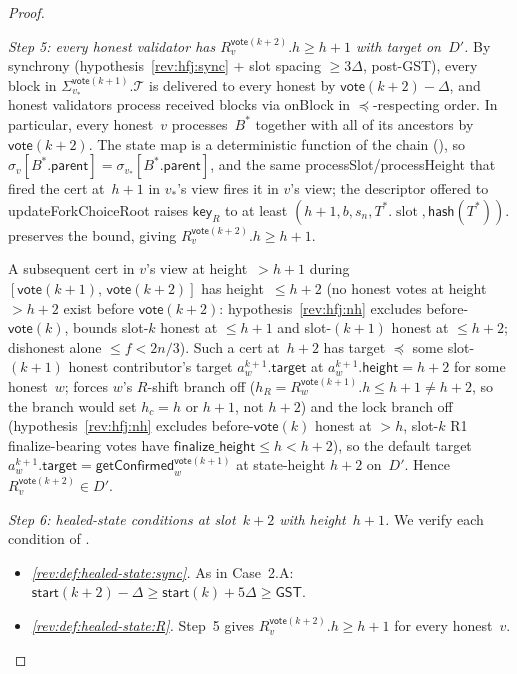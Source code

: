 \documentclass{article}
\newcommand{\T}[0]{\ensuremath{\mathcal{T}}}
\newcommand{\slot}[0]{\ensuremath{\operatorname{\mathrm{slot}}}}
\newcommand{\target}{\mathsf{target}}
\newcommand{\height}{\mathsf{height}}
\newcommand{\parent}{\mathsf{parent}}
\newcommand{\finalizeHeight}{\mathsf{finalize\_height}}
\newcommand{\hash}{\mathsf{hash}}
\newcommand{\key}{\mathsf{key}}
\newcommand{\start}{\mathsf{start}}
\newcommand{\vote}{\mathsf{vote}}
\newcommand{\updateForkChoiceRoot}{\textsf{updateForkChoiceRoot}\xspace}
\newcommand{\getConfirmed}{\textsf{getConfirmed}\xspace}
\theoremstyle{plain}
\theoremstyle{definition}
\theoremstyle{remark}
\newcommand{\GST}{\ensuremath{\mathsf{GST}}}
\begin{document}
\begin{proof}
\begin{description}
\begin{description}
\emph{Step 5: every honest validator has $R_v^{\vote(k+2)}.h \geq h+1$ with target on~$D'$.}
By synchrony (hypothesis~\ref{rev:hfj:sync} + slot spacing $\geq 3\Delta$, post-GST), every block in $\Sigma_{v_*}^{\vote(k+1)}.\T$ is delivered to every honest by $\vote(k+2) - \Delta$, and honest validators process received blocks via onBlock in $\preceq$-respecting order. In particular, every honest~$v$ processes~$B^*$ together with all of its ancestors by $\vote(k+2)$. The state map is a deterministic function of the chain (), so $\sigma_v[B^*.\parent] = \sigma_{v_*}[B^*.\parent]$, and the same processSlot/processHeight that fired the cert at~$h+1$ in $v_*$'s view fires it in $v$'s view; the descriptor offered to \updateForkChoiceRoot raises $\key_R$ to at least $(h+1, b, s_n, T^*.\slot, \hash(T^*))$.  preserves the bound, giving $R_v^{\vote(k+2)}.h \geq h+1$.

A subsequent cert in $v$'s view at height~$>h+1$ during $[\vote(k+1),\, \vote(k+2)]$ has height~$\leq h+2$ (no honest votes at height~$>h+2$ exist before $\vote(k+2)$: hypothesis~\ref{rev:hfj:nh} excludes before-$\vote(k)$,  bounds slot-$k$ honest at $\leq h+1$ and slot-$(k+1)$ honest at $\leq h+2$; dishonest alone $\leq f < 2n/3$). Such a cert at~$h+2$ has target $\preceq$ some slot-$(k+1)$ honest contributor's target $a^{k+1}_w.\target$ at $a^{k+1}_w.\height = h+2$ for some honest~$w$;  forces $w$'s $R$-shift branch off ($h_R = R_w^{\vote(k+1)}.h \leq h+1 \neq h+2$, so the branch would set $h_c = h$ or $h+1$, not $h+2$) and the lock branch off (hypothesis~\ref{rev:hfj:nh} excludes before-$\vote(k)$ honest at $>h$, slot-$k$ R1 finalize-bearing votes have $\finalizeHeight \leq h < h+2$), so the default target $a^{k+1}_w.\target = \getConfirmed_w^{\vote(k+1)}$ at state-height $h+2$ on~$D'$. Hence $R_v^{\vote(k+2)} \in D'$.

\emph{Step 6: healed-state conditions at slot~$k+2$ with height~$h+1$.}
We verify each condition of .
\begin{itemize}
  \item \emph{\ref{rev:def:healed-state:sync}.} As in Case~2.A: $\start(k+2) - \Delta \geq \start(k) + 5\Delta \geq \GST$.

  \item \emph{\ref{rev:def:healed-state:R}.} Step~5 gives $R_v^{\vote(k+2)}.h \geq h+1$ for every honest~$v$.


\end{itemize}
\end{description}
\end{description}
\end{proof}
\end{document}

